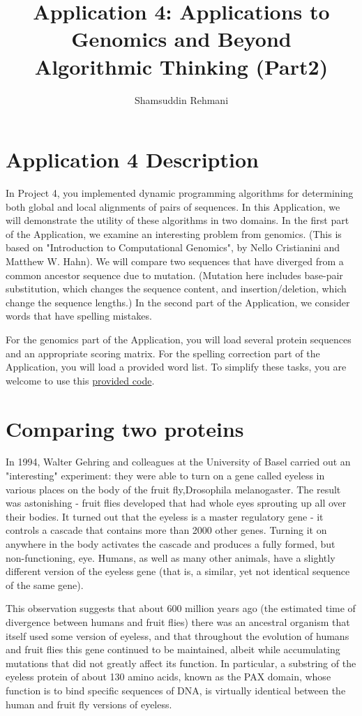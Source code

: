 \documentclass[a4paper]{article}
\title{Application 4: Applications to Genomics and Beyond\\Algorithmic Thinking (Part2)}
\author{Shamsuddin Rehmani}
\begin{document}
\sloppy
\maketitle
\section*{Application 4 Description}
In Project 4, you implemented dynamic programming algorithms for determining both global and local alignments of pairs of sequences. In this Application, we will demonstrate the utility of these algorithms in two domains. In the first part of the Application, we examine an interesting problem from genomics. (This is based on "Introduction to Computational Genomics", by Nello Cristianini and Matthew W. Hahn). We will compare two sequences that have diverged from a common ancestor sequence due to mutation. (Mutation here includes base-pair substitution, which changes the sequence content, and insertion/deletion, which change the sequence lengths.) In the second part of the Application, we consider words that have spelling mistakes.

\noindent For the genomics part of the Application, you will load several protein sequences and an appropriate scoring matrix. For the spelling correction part of the Application, you will load a provided word list. To simplify these tasks, you are welcome to use this \href{http://www.codeskulptor.org/#alg_application4_provided.py}{provided code}.

\section*{Comparing two proteins}
In 1994, Walter Gehring and colleagues at the University of Basel carried out an "interesting" experiment: they were able to turn on a gene called eyeless in various places on the body of the fruit fly,Drosophila melanogaster. The result was astonishing - fruit flies developed that had whole eyes sprouting up all over their bodies. It turned out that the eyeless is a master regulatory gene - it controls a cascade that contains more than 2000 other genes. Turning it on anywhere in the body activates the cascade and produces a fully formed, but non-functioning, eye. Humans, as well as many other animals, have a slightly different version of the eyeless gene (that is, a similar, yet not identical sequence of the same gene).

This observation suggests that about 600 million years ago (the estimated time of divergence between humans and fruit flies) there was an ancestral organism that itself used some version of eyeless, and that throughout the evolution of humans and fruit flies this gene continued to be maintained, albeit while accumulating mutations that did not greatly affect its function. In particular, a substring of the eyeless protein of about 130 amino acids, known as the PAX domain, whose function is to bind specific sequences of DNA, is virtually identical between the human and fruit fly versions of eyeless.
\end{document}

